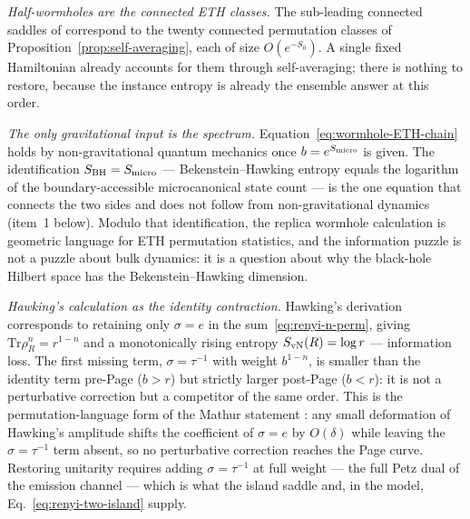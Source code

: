 \documentclass[12pt]{article}
\newcommand{\Tr}{\mathrm{Tr}}
\newcommand{\Smicro}{S_{\rm micro}}
\begin{document}
\smallskip\noindent\emph{Half-wormholes are the connected ETH classes.}
The sub-leading connected saddles of \cite{SaadShenkerStanfordYao2021}
correspond to the twenty connected permutation classes of
Proposition~\ref{prop:self-averaging}, each of size $O(e^{-S_0})$.
A single fixed Hamiltonian already accounts for them through self-averaging;
there is nothing to restore, because the instance entropy is already the
ensemble answer at this order.

\smallskip\noindent\emph{The only gravitational input is the spectrum.}
Equation~\eqref{eq:wormhole-ETH-chain} holds by non-gravitational quantum
mechanics once $b=e^{\Smicro}$ is given.  The identification
$S_{\rm BH}=\Smicro$ --- Bekenstein--Hawking entropy equals the logarithm of
the boundary-accessible microcanonical state count --- is the one equation
that connects the two sides and does not follow from non-gravitational
dynamics (item~1 below).  Modulo that identification, the replica wormhole
calculation is geometric language for ETH permutation statistics, and the
information puzzle is not a puzzle about bulk dynamics: it is a question
about why the black-hole Hilbert space has the Bekenstein--Hawking dimension.

\smallskip\noindent\emph{Hawking's calculation as the identity contraction.}
Hawking's derivation corresponds to retaining only $\sigma=e$ in the
sum~\eqref{eq:renyi-n-perm}, giving $\Tr\rho_R^n=r^{1-n}$ and a
monotonically rising entropy $S_{\rm vN}(R)=\log r$ --- information loss.
The first missing term, $\sigma=\tau^{-1}$ with weight $b^{1-n}$, is
smaller than the identity term pre-Page ($b>r$) but strictly larger
post-Page ($b<r$): it is not a perturbative correction but a competitor of
the same order.  This is the permutation-language form of the Mathur
statement \cite{Mathur2009}: any small deformation of Hawking's amplitude
shifts the coefficient of $\sigma=e$ by $O(\delta)$ while leaving the
$\sigma=\tau^{-1}$ term absent, so no perturbative correction reaches the
Page curve.  Restoring unitarity requires adding $\sigma=\tau^{-1}$ at full
weight --- the full Petz dual of the emission channel --- which is what the
island saddle and, in the model, Eq.~\eqref{eq:renyi-two-island} supply.
\end{document}
